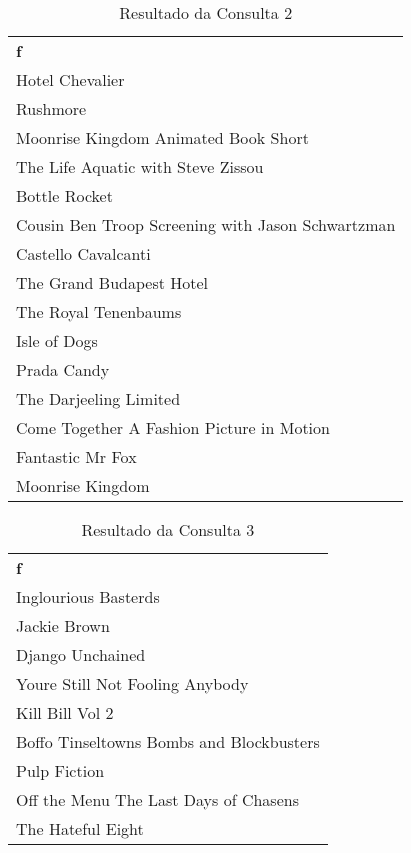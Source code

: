 \documentclass{article}
\begin{document}
\begin{table}[htbp]
\begin{center}
\begin{tabular}{l}

\textbf{f} \\ 
Hotel Chevalier \\ 
Rushmore \\ 
Moonrise Kingdom Animated Book Short \\ 
The Life Aquatic with Steve Zissou \\ 
Bottle Rocket \\ 
Cousin Ben Troop Screening with Jason Schwartzman \\ 
Castello Cavalcanti \\ 
The Grand Budapest Hotel \\ 
The Royal Tenenbaums \\ 
Isle of Dogs \\ 
Prada Candy \\ 
The Darjeeling Limited \\ 
Come Together A Fashion Picture in Motion \\ 
Fantastic Mr Fox \\ 
Moonrise Kingdom \\ 
\end{tabular}
\end{center}
\caption{Resultado da Consulta 2}
\label{}
\end{table}

\begin{table}[htbp]
\begin{center}
\begin{tabular}{l}

\textbf{f} \\ 
Inglourious Basterds \\ 
Jackie Brown \\ 
Django Unchained \\ 
Youre Still Not Fooling Anybody \\ 
Kill Bill Vol 2 \\ 
Boffo Tinseltowns Bombs and Blockbusters \\ 
Pulp Fiction \\ 
Off the Menu The Last Days of Chasens \\ 
The Hateful Eight \\ 
\end{tabular}
\end{center}
\caption{Resultado da Consulta 3}
\label{}
\end{table}
\end{document}
